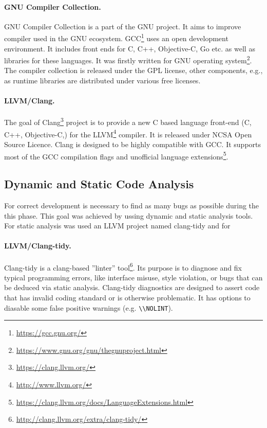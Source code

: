 \paragraph{GNU Compiler Collection.}GNU Compiler Collection is a part of the GNU project.
It aims to improve compiler used in the GNU ecosystem.
GCC\footnote{\url{https://gcc.gnu.org/}} uses an open development environment.
It includes front ends for C, C++, Objective-C, Go etc.
as well as libraries for these languages. It was firstly written for GNU operating system\footnote{\url{https://www.gnu.org/gnu/thegnuproject.html}}.
The compiler collection is released under the GPL license, other components, e.g., as runtime libraries are distributed under various free licenses.

\paragraph{LLVM/Clang.}
The goal of Clang\footnote{\url{https://clang.llvm.org/}} project is to provide a new C based language front-end (C, C++, Objective-C,) for the LLVM\footnote{\url{http://www.llvm.org/}} compiler.
It is released under NCSA Open Source Licence. Clang is designed to be highly compatible with GCC.
It supports most of the GCC compilation flags and unofficial language extensions\footnote{\url{https://clang.llvm.org/docs/LanguageExtensions.html}}.


\subsection{Dynamic and Static Code Analysis}
For correct development is necessary to find as many bugs as possible during the this phase.
This goal was achieved by ussing dynamic and static analysis tools.
For static analysis was used an LLVM project named clang-tidy and for

\paragraph{LLVM/Clang-tidy.}
Clang-tidy is a clang-based ''linter'' tool\footnote{\url{http://clang.llvm.org/extra/clang-tidy/}}.
Its purpose is to diagnose and fix typical programming errors,
like interface misuse, style violation, or bugs that can be deduced via static analysis.
Clang-tidy diagnostics are designed to assert code that has invalid coding standard or is otherwise problematic.
It has options to diasable some false positive warnings (e.g. \texttt{\textbackslash\textbackslash NOLINT}).

